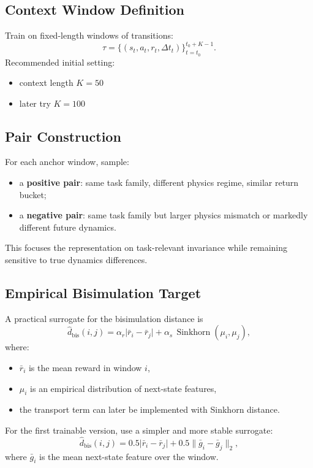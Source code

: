 \documentclass[11pt]{article}
\begin{document}
\subsection{Context Window Definition}
Train on fixed-length windows of transitions:
\[
\tau = \{(s_t, a_t, r_t, \Delta t_t)\}_{t=t_0}^{t_0+K-1}.
\]
Recommended initial setting:
\begin{itemize}[leftmargin=1.5em]
    \item context length $K = 50$
    \item later try $K = 100$
\end{itemize}

\subsection{Pair Construction}
For each anchor window, sample:
\begin{itemize}[leftmargin=1.5em]
    \item a \textbf{positive pair}: same task family, different physics regime, similar return bucket;
    \item a \textbf{negative pair}: same task family but larger physics mismatch or markedly different future dynamics.
\end{itemize}

This focuses the representation on task-relevant invariance while remaining sensitive to true dynamics differences.

\subsection{Empirical Bisimulation Target}
A practical surrogate for the bisimulation distance is
\[
\widehat{d}_{\text{bis}}(i,j) = \alpha_r \lvert \bar r_i - \bar r_j \rvert + \alpha_s\,\operatorname{Sinkhorn}(\mu_i, \mu_j),
\]
where:
\begin{itemize}[leftmargin=1.5em]
    \item $\bar r_i$ is the mean reward in window $i$,
    \item $\mu_i$ is an empirical distribution of next-state features,
    \item the transport term can later be implemented with Sinkhorn distance.
\end{itemize}

For the first trainable version, use a simpler and more stable surrogate:
\[
\widehat{d}_{\text{bis}}(i,j) = 0.5\lvert \bar r_i - \bar r_j \rvert + 0.5\lVert \bar g_i - \bar g_j \rVert_2,
\]
where $\bar g_i$ is the mean next-state feature over the window.
\end{document}
